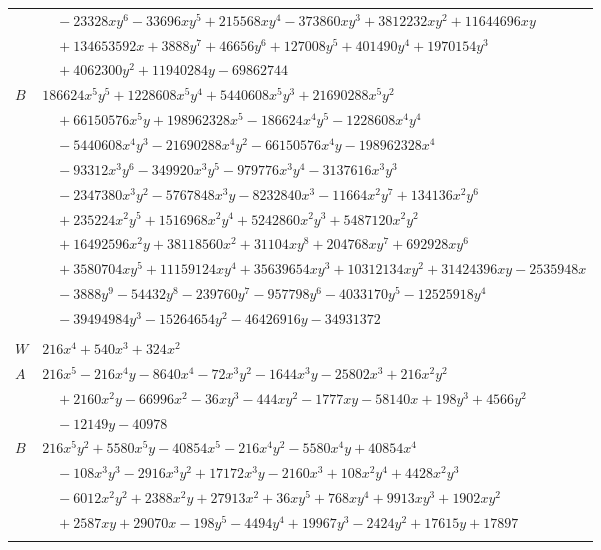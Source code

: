 \documentclass[11pt]{article}
\begin{document}
\begin{longtable}{@{}ll@{}}
 & $\quad -23328xy^{6}-33696xy^{5}+215568xy^{4}-373860xy^{3}+3812232xy^{2}+11644696xy$\\
 & $\quad +134653592x+3888y^{7}+46656y^{6}+127008y^{5}+401490y^{4}+1970154y^{3}$\\
 & $\quad +4062300y^{2}+11940284y-69862744$\\
$B$ & $186624x^{5}y^{5}+1228608x^{5}y^{4}+5440608x^{5}y^{3}+21690288x^{5}y^{2}$\\
 & $\quad +66150576x^{5}y+198962328x^{5}-186624x^{4}y^{5}-1228608x^{4}y^{4}$\\
 & $\quad -5440608x^{4}y^{3}-21690288x^{4}y^{2}-66150576x^{4}y-198962328x^{4}$\\
 & $\quad -93312x^{3}y^{6}-349920x^{3}y^{5}-979776x^{3}y^{4}-3137616x^{3}y^{3}$\\
 & $\quad -2347380x^{3}y^{2}-5767848x^{3}y-8232840x^{3}-11664x^{2}y^{7}+134136x^{2}y^{6}$\\
 & $\quad +235224x^{2}y^{5}+1516968x^{2}y^{4}+5242860x^{2}y^{3}+5487120x^{2}y^{2}$\\
 & $\quad +16492596x^{2}y+38118560x^{2}+31104xy^{8}+204768xy^{7}+692928xy^{6}$\\
 & $\quad +3580704xy^{5}+11159124xy^{4}+35639654xy^{3}+10312134xy^{2}+31424396xy-2535948x$\\
 & $\quad -3888y^{9}-54432y^{8}-239760y^{7}-957798y^{6}-4033170y^{5}-12525918y^{4}$\\
 & $\quad -39494984y^{3}-15264654y^{2}-46426916y-34931372$\\
\addlinespace[3pt]
\multicolumn{2}{@{}l}{$i=82$, $m=18$, neighbours $5,37,45,66,79$}\\
$W$ & $216x^{4}+540x^{3}+324x^{2}$\\
$A$ & $216x^{5}-216x^{4}y-8640x^{4}-72x^{3}y^{2}-1644x^{3}y-25802x^{3}+216x^{2}y^{2}$\\
 & $\quad +2160x^{2}y-66996x^{2}-36xy^{3}-444xy^{2}-1777xy-58140x+198y^{3}+4566y^{2}$\\
 & $\quad -12149y-40978$\\
$B$ & $216x^{5}y^{2}+5580x^{5}y-40854x^{5}-216x^{4}y^{2}-5580x^{4}y+40854x^{4}$\\
 & $\quad -108x^{3}y^{3}-2916x^{3}y^{2}+17172x^{3}y-2160x^{3}+108x^{2}y^{4}+4428x^{2}y^{3}$\\
 & $\quad -6012x^{2}y^{2}+2388x^{2}y+27913x^{2}+36xy^{5}+768xy^{4}+9913xy^{3}+1902xy^{2}$\\
 & $\quad +2587xy+29070x-198y^{5}-4494y^{4}+19967y^{3}-2424y^{2}+17615y+17897$\\
\addlinespace[3pt]

\end{longtable}
\end{document}
